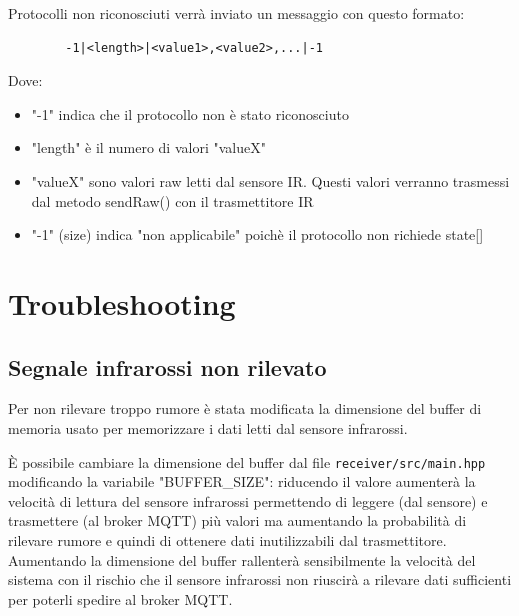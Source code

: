 \documentclass[a4paper,11pt]{article}
\begin{document}
    \bigskip

    \begin{samepage}
      Protocolli non riconosciuti verrà inviato un messaggio con questo formato:

      \begin{verbatim}
        -1|<length>|<value1>,<value2>,...|-1
      \end{verbatim}

      Dove:
      \begin{itemize}
          \item "-1" indica che il protocollo non è stato riconosciuto
          \item "length" è il numero di valori "valueX"
          \item "valueX" sono valori raw letti dal sensore IR. Questi valori verranno trasmessi dal metodo sendRaw() con il trasmettitore IR
          \item "-1" (size) indica "non applicabile" poichè il protocollo non richiede state[]
      \end{itemize}
    \end{samepage}

\section{Troubleshooting}

    \subsection{Segnale infrarossi non rilevato}

    Per non rilevare troppo rumore è stata modificata la dimensione del buffer di memoria usato per memorizzare i dati letti dal sensore infrarossi.

    È possibile cambiare la dimensione del buffer dal file \texttt{receiver/src/main.hpp} modificando la variabile "BUFFER\_SIZE": riducendo il valore aumenterà la velocità di lettura 
    del sensore infrarossi permettendo di leggere (dal sensore) e trasmettere (al broker MQTT) più valori ma aumentando la probabilità di rilevare rumore e quindi di ottenere dati inutilizzabili dal trasmettitore.
    Aumentando la dimensione del buffer rallenterà sensibilmente la velocità del sistema con il rischio che il sensore infrarossi non riuscirà a rilevare dati sufficienti per poterli spedire al broker MQTT.

\clearpage

\listoffigures
{}
\end{document}
